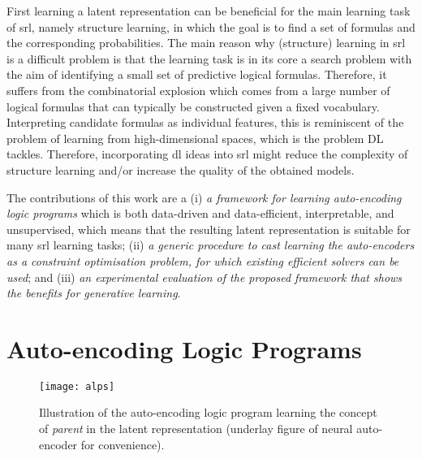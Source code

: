 First learning a latent representation can be beneficial for the main learning task of \gls{srl}, namely structure learning, in which the goal is to find a set of formulas and the corresponding probabilities.
The main reason why (structure) learning in \gls{srl} is a difficult problem is that the learning task is in its core a search problem with the aim of identifying a small set of predictive logical formulas.
Therefore, it suffers from the combinatorial explosion which comes from a large number of logical formulas that can typically be constructed given a fixed vocabulary.
Interpreting candidate formulas as individual features, this is reminiscent of the problem of learning from high-dimensional spaces, which is the problem DL tackles.
Therefore, incorporating \gls{dl} ideas into \gls{srl} might reduce the complexity of structure learning and/or increase the quality of the obtained models.


The contributions of this work are a (i) \textit{a framework for learning auto-encoding logic programs} which is both data-driven and data-efficient, interpretable, and unsupervised, which means that the resulting latent representation is suitable for many \gls{srl} learning tasks; (ii) \textit{a generic procedure to cast learning the auto-encoders as a constraint optimisation problem, for which existing efficient solvers can be used}; and (iii) \textit{an experimental evaluation of the proposed framework that shows the benefits for generative learning}.





\section{Auto-encoding Logic Programs}

\begin{sidewaysfigure}
	\centering
    \texttt{[image: alps]}
    \caption[Illustration of the Auto-encoding logic programs]{Illustration of the auto-encoding logic program learning the concept of \textit{parent} in the latent representation (underlay figure of neural auto-encoder for convenience).\label{fig:alp}}
\end{sidewaysfigure}



